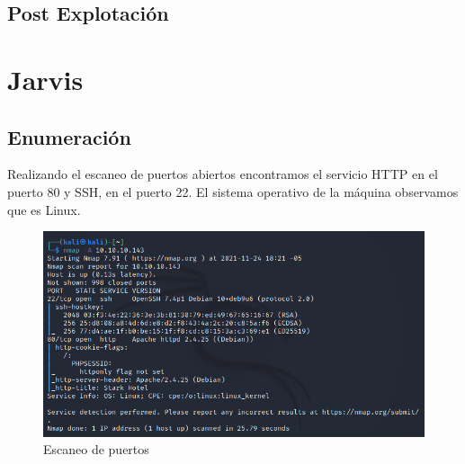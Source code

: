 \documentclass{article}
\begin{document}
\subsection{Post Explotación}

\clearpage 
\section{Jarvis}
\subsection{Enumeración}
Realizando el escaneo de puertos abiertos encontramos el servicio HTTP en el puerto 80 y SSH, en el puerto 22. El sistema operativo de la máquina observamos que es Linux.
\begin{figure}[H]
	\center
	\includegraphics[width=\textwidth]{images/jarvis/1.png}
	\caption{Escaneo de puertos}
\end{figure}
\end{document}
